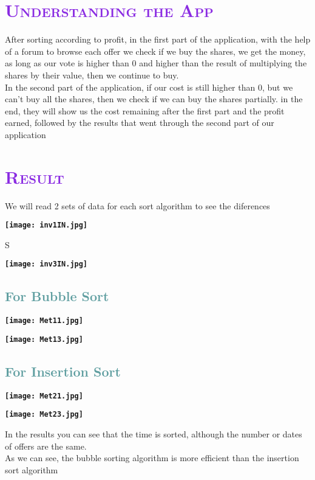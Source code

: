 \documentclass{article}
\begin{document}
\section{\bfseries\scshape\textcolor{BlueViolet}{Understanding the App}}
After sorting according to profit, in the first part of the application, with the help of a forum to browse each offer we check if we buy the shares, we get the money, as long as our vote is higher than 0 and higher than the result of multiplying the shares by their value, then we continue to buy.\\
In the second part of the application, if our cost is still higher than 0, but we can’t buy all the shares, then we check if we can buy the shares partially.
in the end, they will show us the cost remaining after the first part and the profit earned, followed by the results that went through the second part of our application

\section{\bfseries\scshape\textcolor{BlueViolet}{Result}}
We will read 2 sets of data for each sort algorithm to see the diferences

\begin{center}
    \textbf{\texttt{[image: inv1IN.jpg]}}
\end{center}S
\begin{center}
    \textbf{\texttt{[image: inv3IN.jpg]}}
\end{center}
\subsection{\textcolor{CadetBlue}{For Bubble Sort}}
\begin{center}
    \textbf{\texttt{[image: Met11.jpg]}}
\end{center}
\begin{center}
    \textbf{\texttt{[image: Met13.jpg]}}
\end{center}
\subsection{\textcolor{CadetBlue}{For Insertion Sort}}
\begin{center}
    \textbf{\texttt{[image: Met21.jpg]}}
\end{center}
\begin{center}
    \textbf{\texttt{[image: Met23.jpg]}}
\end{center}
In the results you can see that the time is sorted, although the number or dates of offers are the same.\\
As we can see, the bubble sorting algorithm is more efficient than the insertion sort algorithm
\end{document}
